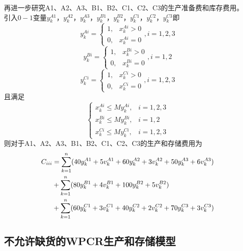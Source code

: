 再进一步研究A1、A2、A3、B1、B2、C1、C2、C3的生产准备费和库存费用。
引入$0-1$变量$y_k^{A1}$，$y_k^{A2}$，$y_k^{A3}$，$y_k^{B1}$，$y_k^{B2}$，$y_k^{C1}$，$y_k^{C2}$，$y_k^{C3}$即
\begin{equation}
    y_k^{Ai}=\begin{cases}
        1, & x_k^{Ai}>0\\
        0, & x_k^{Ai}=0
    \end{cases},i=1,2,3
\end{equation}
\begin{equation}
    y_k^{Bi}=\begin{cases}
        1, & x_k^{Bi}>0\\
        0, & x_k^{Bi}=0
    \end{cases},i=1,2
\end{equation}
\begin{equation}
    y_k^{Ci}=\begin{cases}
        1, & x_k^{Ci}>0\\
        0, & x_k^{Ci}=0
    \end{cases},i=1,2,3
\end{equation}
且满足
\begin{equation}
    \begin{cases}
        x_k^{Ai} \leq My_k^{Ai}, &i=1,2,3 \\
        x_k^{Bi} \leq My_k^{Bi},&i=1,2 \\
        x_k^{Ci} \leq My_k^{Ci},&i=1,2,3
    \end{cases}
\end{equation}
则对于A1、A2、A3、B1、B2、C1、C2、C3的生产和存储费用为
\begin{equation}
    \begin{aligned}
        C_{\uppercase\expandafter{\romannumeral3}} &= 
            \sum_{k=1}^{n}(40y_k^{A1}+5v_k^{A1}+60y_k^{A2}+3v_k^{A2}+50y_k^{A3}+6v_k^{A3}) \\
            &+ \sum_{k=1}^{n}(80y_k^{B1}+4v_k^{B1}+100y_k^{B2}+5v_k^{B2}) \\
            &+ \sum_{k=1}^{n}(60y_k^{C1}+3v_k^{C1}+40y_k^{C2}+2v_k^{C2}+70y_k^{C3}+3v_k^{C3})
    \end{aligned}
\end{equation}



\subsection{不允许缺货的WPCR生产和存储模型}

